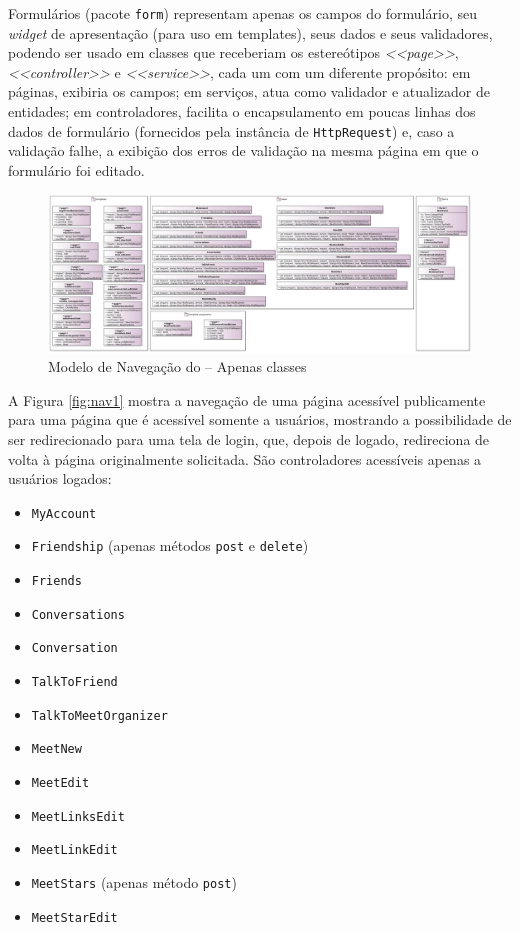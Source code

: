 Formulários (pacote \texttt{form}) representam apenas os campos do formulário, seu \textit{widget} de apresentação (para uso em templates), seus dados e seus validadores, podendo ser usado em classes que receberiam os estereótipos \textit{<<page>>}, \textit{<<controller>>} e \textit{<<service>>}, cada um com um diferente propósito: em páginas, exibiria os campos; em serviços, atua como validador e atualizador de entidades; em controladores, facilita o encapsulamento em poucas linhas dos dados de formulário (fornecidos pela instância de \texttt{HttpRequest}) e, caso a validação falhe, a exibição dos erros de validação na mesma página em que o formulário foi editado.

\begin{figure}
	\centering
	\includegraphics[width=0.8\paperheight, angle=270]{figuras/FrameWebNavigationModel.jpg}
	\caption{Modelo de Navegação do \imprimirtitulo{} -- Apenas classes}
	\label{fig:nav0}
\end{figure}

A Figura \ref{fig:nav1} mostra a navegação de uma página acessível publicamente para uma página que é acessível somente a usuários, mostrando a possibilidade de ser redirecionado para uma tela de login, que, depois de logado, redireciona de volta à página originalmente solicitada. São controladores acessíveis apenas a usuários logados:
\begin{itemize}
  \item \texttt{MyAccount}
  \item \texttt{Friendship} (apenas métodos \texttt{post} e \texttt{delete})
  \item \texttt{Friends}
  \item \texttt{Conversations}
  \item \texttt{Conversation}
  \item \texttt{TalkToFriend}
  \item \texttt{TalkToMeetOrganizer}
  \item \texttt{MeetNew}
  \item \texttt{MeetEdit}
  \item \texttt{MeetLinksEdit}
  \item \texttt{MeetLinkEdit}
  \item \texttt{MeetStars} (apenas método \texttt{post})
  \item \texttt{MeetStarEdit}
\end{itemize}

